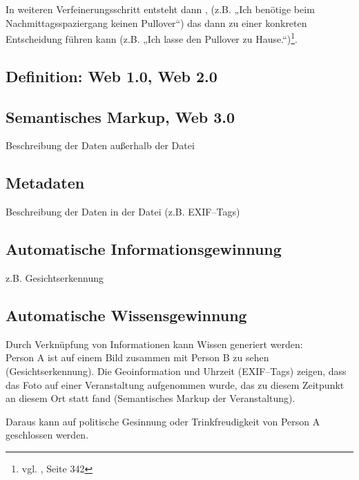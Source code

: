 In weiteren Verfeinerungsschritt entsteht dann , (z.B. „Ich benötige beim Nachmittagsspaziergang keinen Pullover“) das dann zu einer konkreten Entscheidung führen kann (z.B. „Ich lasse den Pullover zu Hause.“)\footnote{vgl. \cite{taylor}, Seite 342}.

\subsection{Definition: Web 1.0, Web 2.0}

\subsection{Semantisches Markup, Web 3.0}

Beschreibung der Daten außerhalb der Datei

\subsection{Metadaten}

Beschreibung der Daten in der Datei (z.B. EXIF--Tags)

\subsection{Automatische Informationsgewinnung}

z.B. Gesichtserkennung

\subsection{Automatische Wissensgewinnung}

Durch Verknüpfung von Informationen kann Wissen generiert werden:\\
Person A ist auf einem Bild zusammen mit Person B zu sehen (Gesichtserkennung). Die Geoinformation und Uhrzeit (EXIF--Tags) zeigen, dass das Foto auf einer Veranstaltung aufgenommen wurde, das zu diesem Zeitpunkt an diesem Ort statt fand (Semantisches Markup der Veranstaltung).

Daraus kann auf politische Gesinnung oder Trinkfreudigkeit von Person A geschlossen werden.